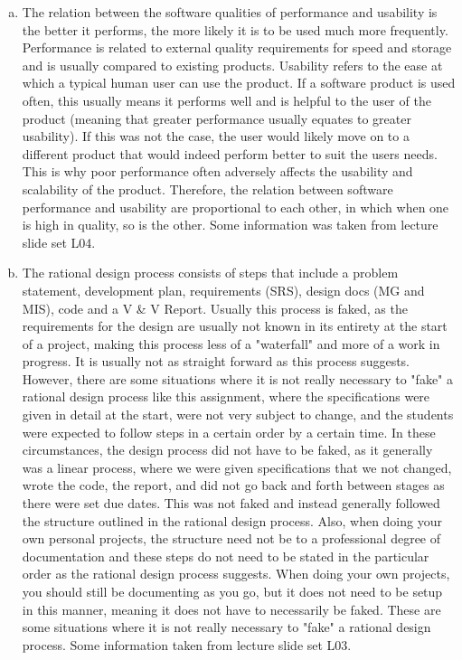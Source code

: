 \documentclass[12pt]{article}
\begin{document}
\begin{enumerate}[(a)]
\item The relation between the software qualities of performance and usability is 
the better it performs, the more likely it is to be used much more frequently. 
Performance is related to external quality requirements for speed and storage 
and is usually compared to existing products. Usability refers to the ease at 
which a typical human user can use the product. If a software product is used 
often, this usually means it performs well and is helpful to the user of the 
product (meaning that greater performance usually equates to greater usability). 
If this was not the case, the user would likely move on to a different product 
that would indeed perform better to suit the users needs. This is why poor 
performance often adversely affects the usability and scalability of the product. 
Therefore, the relation between software performance and usability are proportional 
to each other, in which when one is high in quality, so is the other. Some 
information was taken from lecture slide set L04. 

\item The rational design process consists of steps that include a problem 
statement, development plan, requirements (SRS), design docs (MG and MIS), 
code and a V \& V Report. Usually this process is faked, as the requirements 
for the design are usually not known in its entirety at the start of a project, 
making this process less of a "waterfall" and more of a work in progress. It 
is usually not as straight forward as this process suggests. However, there 
are some situations where it is not really necessary to "fake" a rational design 
process like this assignment, where the specifications were given in detail at 
the start, were not very subject to change, and the students were expected to 
follow steps in a certain order by a certain time. In these circumstances, the 
design process did not have to be faked, as it generally was a linear process, 
where we were given specifications that we not changed, wrote the code, the 
report, and did not go back and forth between stages as there were set due 
dates. This was not faked and instead generally followed the structure outlined 
in the rational design process. Also, when doing your own personal projects, 
the structure need not be to a professional degree of documentation and these 
steps do not need to be stated in the particular order as the rational design 
process suggests. When doing your own projects, you should still be documenting 
as you go, but it does not need to be setup in this manner, meaning it does not 
have to necessarily be faked. These are some situations where it is not really 
necessary to "fake" a rational design process. Some information taken from lecture 
slide set L03. 
 

\end{enumerate}
\end{document}
